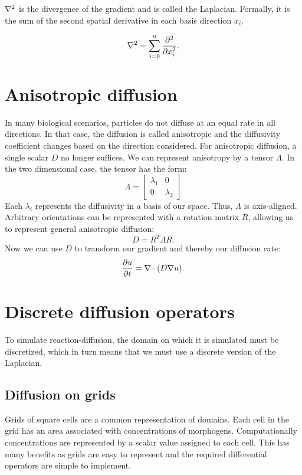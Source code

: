 $\nabla^2$ is the divergence of the gradient and is called the Laplacian. Formally, it is the sum of the second spatial derivative in each basis direction $x_i$.

\begin{equation}
\label{eq:laplacian}
	\nabla^2 = \sum_{i=0}^{n} \frac{\partial^2}{\partial x_i^2}.
\end{equation}
	
\section{Anisotropic diffusion}
In many biological scenarios, particles do not diffuse at an equal rate in all directions. In that case, the diffusion is called anisotropic and the diffusivity coefficient changes based on the direction considered. For anisotropic diffusion, a single scalar $D$ no longer suffices. We can represent anisotropy by a tensor $\Lambda$. In the two dimensional case, the tensor has the form:
\[\Lambda =
\begin{bmatrix}
    \lambda_1 & 0 \\
    0 & \lambda_2 
\end{bmatrix}\]
Each $\lambda_i$ represents the diffusivity in a basis of our space. Thus, $\Lambda$ is axis-aligned. Arbitrary orientations can be represented with a rotation matrix $R$, allowing us to represent general anisotropic diffusion:
\[D = R^T \Lambda R.\]
Now we can use $D$ to transform our gradient and thereby our diffusion rate:
\begin{equation}
\label{eq:anisoLap}
	\frac{\partial u}{\partial t} = \nabla \cdot (D \nabla u).
\end{equation}
\section{Discrete diffusion operators}
To simulate reaction-diffusion, the domain on which it is simulated must be discretized, which in turn means that we must use a discrete version of the Laplacian.

\subsection{Diffusion on grids}
Grids of square cells are a common representation of domains. Each cell in the grid has an area associated with concentrations of morphogens. Computationally concentrations are represented by a scalar value assigned to each cell. This has many benefits as grids are easy to represent and the required differential operators are simple to implement.

